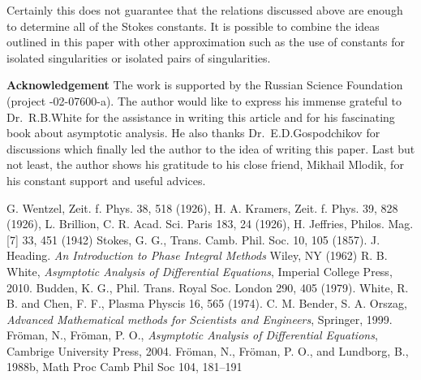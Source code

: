 \documentclass[aps,prl,preprint,superscriptaddress]{revtex4}
\begin{document}
Certainly this does not guarantee that the relations discussed above are enough to determine all of the Stokes constants. It is possible to combine the ideas outlined in this paper with other approximation such as the use of constants for isolated singularities or isolated pairs of singularities.

\textbf{Acknowledgement}
The work is supported by the Russian Science Foundation (project -02-07600-a). The author would like to express his immense grateful to Dr.~R.B.White for the assistance in writing this article and for his fascinating book about asymptotic analysis. He also thanks Dr.~E.D.Gospodchikov for discussions which finally led the author to the idea of writing this paper. Last but not least, the author shows his gratitude to his close friend, Mikhail Mlodik, for his constant support and useful advices.

\begin{thebibliography}{10}
 G. Wentzel, Zeit. f. Phys. 38, 518 (1926), H. A. Kramers,
 Zeit. f. Phys. 39, 828 (1926), L. Brillion, C. R. Acad. Sci. Paris 183, 
24 (1926), H. Jeffries, Philos. Mag. [7] 33, 451 (1942)
 Stokes, G. G., Trans. Camb. Phil. Soc. 10, 105 (1857).
 J. Heading. {\it An Introduction to Phase Integral Methods} 
Wiley, NY (1962)
 R. B. White,
 {\it Asymptotic Analysis of Differential Equations}, Imperial College Press, 2010.
 Budden, K. G., Phil. Trans. Royal Soc. London 290, 405 (1979).
 White, R. B. and Chen, F. F., Plasma Physcis 16, 565 (1974).
 C. M. Bender, S. A. Orszag,
 {\it Advanced Mathematical methods for Scientists and Engineers}, Springer, 1999.
 Fr\"oman, N., Fr\"oman, P. O.,
 {\it Asymptotic Analysis of Differential Equations}, Cambrige University Press, 2004. 
 Fr\"oman, N., Fr\"oman, P. O., and Lundborg, B., 1988b, Math Proc Camb Phil Soc 104, 181–191
\end{thebibliography}
\end{document}
